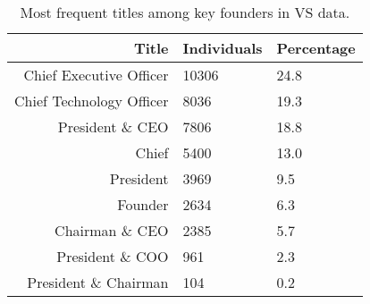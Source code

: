 \begin{table}[]
\centering
\begingroup\normalsize
\begin{tabular}{rll}
  \toprule
Title & Individuals & Percentage \\ 
  \midrule
Chief Executive Officer & 10306 & 24.8 \\ 
  Chief Technology Officer & 8036 & 19.3 \\ 
  President \& CEO & 7806 & 18.8 \\ 
  Chief & 5400 & 13.0 \\ 
  President & 3969 & 9.5 \\ 
  Founder & 2634 & 6.3 \\ 
  Chairman \& CEO & 2385 & 5.7 \\ 
  President \& COO & 961 & 2.3 \\ 
  President \& Chairman & 104 & 0.2 \\ 
   \bottomrule
\end{tabular}
\endgroup
\caption{Most frequent titles among key founders in VS data.} 
\label{table:VS_founder2_titlesSummaryTable}
\end{table}
